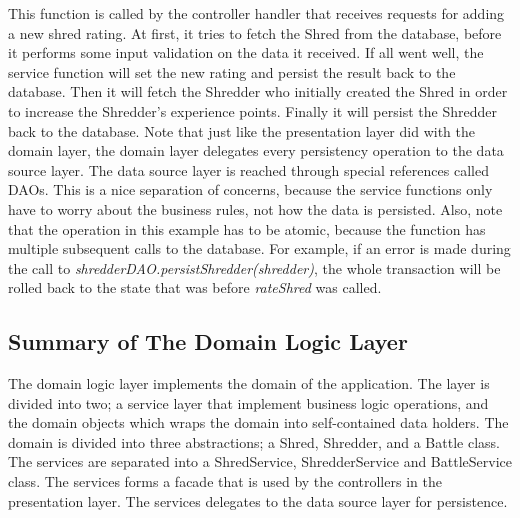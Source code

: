 This function is called by the controller handler that receives requests for adding a new shred rating. At first, it tries to fetch the Shred from the database, before it performs some input validation on the data it received. If all went well, the service function will set the new rating and persist the result back to the database. Then it will fetch the Shredder who initially created the Shred in order to increase the Shredder's experience points. Finally it will persist the Shredder back to the database. Note that just like the presentation layer did with the domain layer, the domain layer  delegates every persistency operation to the data source layer. The data source layer is reached through special references called DAOs. This is a nice separation of concerns, because the service functions only have to worry about the business rules, not how the data is persisted. Also, note that the operation in this example has to be atomic, because the function has multiple subsequent calls to the database. For example, if an error is made during the call to \textit{shredderDAO.persistShredder(shredder)}, the whole transaction will be rolled back to the state that was before \textit{rateShred} was called.

\subsection{Summary of The Domain Logic Layer}
The domain logic layer implements the domain of the application. The layer is divided into two; a service layer that implement business logic operations, and the domain objects which wraps the domain into self-contained data holders. The domain is divided into three abstractions; a Shred, Shredder, and a Battle class. The services are separated into a ShredService, ShredderService and BattleService class. The services forms a facade that is used by the controllers in the presentation layer. The services delegates to the data source layer for persistence.

	
